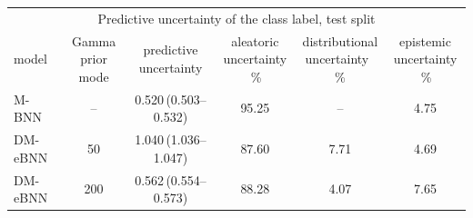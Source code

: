\begin{tabular}{lccccc}
\toprule
\multicolumn{6}{c}{Predictive uncertainty of the class label, test split} \\
model & \shortstack{Gamma prior\\mode} & \shortstack{predictive\\uncertainty} & \shortstack{aleatoric\\uncertainty \,\%} & \shortstack{distributional\\uncertainty \,\%} & \shortstack{epistemic\\uncertainty \,\%} \\
\midrule
M-BNN & -- & 0.520\,(0.503--0.532) & 95.25 & -- & 4.75 \\
DM-eBNN & 50 & 1.040\,(1.036--1.047) & 87.60 & 7.71 & 4.69 \\
DM-eBNN & 200 & 0.562\,(0.554--0.573) & 88.28 & 4.07 & 7.65 \\
\bottomrule
\end{tabular}
